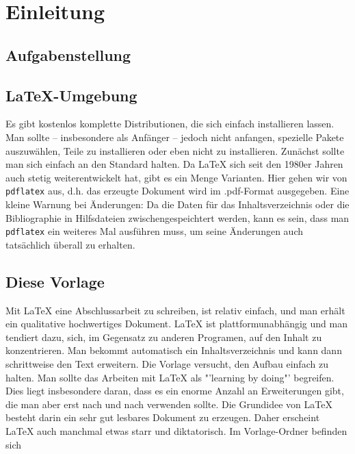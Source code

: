 \documentclass[10pt]{report}
\begin{document}
\tableofcontents

\chapter{Einleitung}

\section{Aufgabenstellung}
\section{\LaTeX{}-Umgebung}

Es gibt kostenlos komplette Distributionen, die sich einfach installieren lassen. Man sollte -- insbesondere als Anf\"anger -- jedoch nicht anfangen, spezielle Pakete auszuw\"ahlen, Teile zu installieren oder eben nicht zu installieren. Zun\"achst sollte man sich einfach an den Standard halten. Da \LaTeX{} sich seit den 1980er Jahren auch stetig weiterentwickelt hat, gibt es ein Menge Varianten. Hier gehen wir von \verb|pdflatex| aus, d.h. das erzeugte Dokument wird im .pdf-Format ausgegeben. Eine kleine Warnung bei \"Anderungen: Da die Daten f\"ur das Inhaltsverzeichnis oder die Bibliographie in Hilfsdateien zwischengespeichtert werden, kann es sein, dass man \verb|pdflatex| ein weiteres Mal ausf\"uhren muss, um seine \"Anderungen auch tats\"achlich \"uberall zu erhalten.

\section{Diese Vorlage} 

Mit \LaTeX{} eine Abschlussarbeit zu schreiben, ist relativ einfach, und man erh\"alt ein qualitative hochwertiges Dokument. \LaTeX{} ist plattformunabh\"angig und man tendiert dazu, sich, im Gegensatz zu anderen Programen, auf den Inhalt zu konzentrieren. Man bekommt automatisch ein Inhaltsverzeichnis und kann dann schrittweise den Text erweitern. Die Vorlage versucht, den Aufbau einfach zu halten. Man sollte das Arbeiten mit \LaTeX{} als "'learning by doing"' begreifen. Dies liegt insbesondere daran, dass es ein enorme Anzahl an Erweiterungen gibt, die man aber erst nach und nach verwenden sollte. Die Grundidee von \LaTeX{} besteht darin ein sehr gut lesbares Dokument zu erzeugen. Daher erscheint \LaTeX{} auch manchmal etwas starr und diktatorisch. Im Vorlage-Ordner befinden sich 
\end{document}
